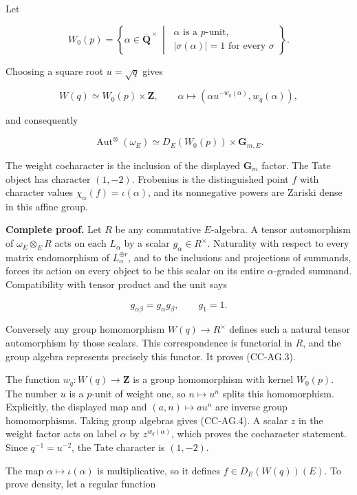 \documentclass[11pt,a4paper]{article}
\theoremstyle{definition}\newtheorem{definition}[theorem]{Definition}
\theoremstyle{remark}\newtheorem{remark}[theorem]{Remark}
\begin{document}
Let

\[
 W_0(p)=\left\{\alpha\in\overline{\mathbf Q}^{\,\times}\ \middle|\
 \begin{array}{l}
 \alpha\text{ is a }p\text{-unit},\\
 |\sigma(\alpha)|=1\text{ for every }\sigma
 \end{array}\right\}.
\]

Choosing a square root \(u=\sqrt q\) gives

\[
 W(q)\simeq W_0(p)\times\mathbf Z,\qquad
 \alpha\longmapsto(\alpha u^{-w_q(\alpha)},w_q(\alpha)),
\]

and consequently

\[
 \operatorname{Aut}^{\otimes}(\omega_E)
       \simeq D_E(W_0(p))\times\mathbf G_{m,E}.       \tag{CC-AG.4}
\]

The weight cocharacter is the inclusion of the displayed \(\mathbf G_m\)
factor. The Tate object has character \((1,-2)\). Frobenius is the
distinguished point \(f\) with character values
\(\chi_\alpha(f)=\iota(\alpha)\), and its nonnegative powers are Zariski
dense in this affine group.

\textbf{Complete proof.} Let \(R\) be any commutative \(E\)-algebra. A
tensor automorphism of \(\omega_E\otimes_E R\) acts on each \(L_\alpha\)
by a scalar \(g_\alpha\in R^\times\). Naturality with respect to every
matrix endomorphism of \(L_\alpha^{\oplus r}\), and to the inclusions
and projections of summands, forces its action on every object to be
this scalar on its entire \(\alpha\)-graded summand. Compatibility with
tensor product and the unit says

\[
 g_{\alpha\beta}=g_\alpha g_\beta,\qquad g_1=1.
\]

Conversely any group homomorphism \(W(q)\to R^\times\) defines such a
natural tensor automorphism by those scalars. This correspondence is
functorial in \(R\), and the group algebra represents precisely this
functor. It proves (CC-AG.3).

The function \(w_q:W(q)\to\mathbf Z\) is a group homomorphism with
kernel \(W_0(p)\). The number \(u\) is a \(p\)-unit of weight one, so
\(n\mapsto u^n\) splits this homomorphism. Explicitly, the displayed map
and \((a,n)\mapsto au^n\) are inverse group homomorphisms. Taking group
algebras gives (CC-AG.4). A scalar \(z\) in the weight factor acts on
label \(\alpha\) by \(z^{w_q(\alpha)}\), which proves the cocharacter
statement. Since \(q^{-1}=u^{-2}\), the Tate character is \((1,-2)\).

The map \(\alpha\mapsto\iota(\alpha)\) is multiplicative, so it defines
\(f\in D_E(W(q))(E)\). To prove density, let a regular function
\end{document}
